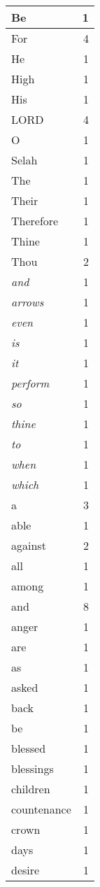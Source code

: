 \begin{center}
\begin{longtable}{l|r}
\hline \hline
\endlastfoot
Be & 1 \\ \hline
For & 4 \\ \hline
He & 1 \\ \hline
High & 1 \\ \hline
His & 1 \\ \hline
LORD & 4 \\ \hline
O & 1 \\ \hline
Selah & 1 \\ \hline
The & 1 \\ \hline
Their & 1 \\ \hline
Therefore & 1 \\ \hline
Thine & 1 \\ \hline
Thou & 2 \\ \hline
\emph{and} & 1 \\ \hline
\emph{arrows} & 1 \\ \hline
\emph{even} & 1 \\ \hline
\emph{is} & 1 \\ \hline
\emph{it} & 1 \\ \hline
\emph{perform} & 1 \\ \hline
\emph{so} & 1 \\ \hline
\emph{thine} & 1 \\ \hline
\emph{to} & 1 \\ \hline
\emph{when} & 1 \\ \hline
\emph{which} & 1 \\ \hline
a & 3 \\ \hline
able & 1 \\ \hline
against & 2 \\ \hline
all & 1 \\ \hline
among & 1 \\ \hline
and & 8 \\ \hline
anger & 1 \\ \hline
are & 1 \\ \hline
as & 1 \\ \hline
asked & 1 \\ \hline
back & 1 \\ \hline
be & 1 \\ \hline
blessed & 1 \\ \hline
blessings & 1 \\ \hline
children & 1 \\ \hline
countenance & 1 \\ \hline
crown & 1 \\ \hline
days & 1 \\ \hline
desire & 1 \\ \hline

\end{longtable}
\end{center}
